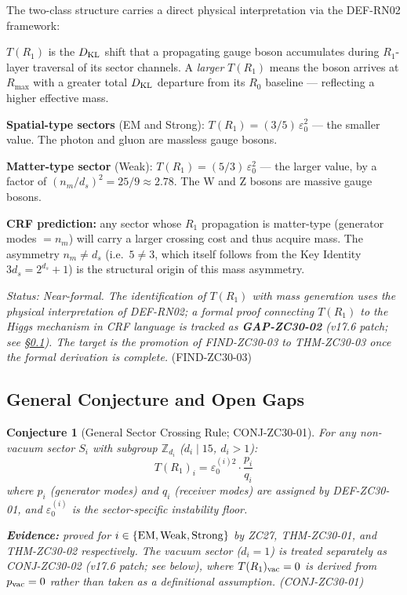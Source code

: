 \documentclass[12pt, a4paper]{article}
\newtheorem{conjecture}{Conjecture}[section]
\begin{document}
\begin{derivedbox}[title={FIND-ZC30-03:
  Massless/Massive Signature at $R_0$ Layer (Near-formal)}]
The two-class structure carries a direct physical interpretation
via the DEF-RN02 framework:

\medskip
$T(R_1)$ is the $D_{\rm KL}$ shift that a propagating gauge boson
accumulates during $R_1$-layer traversal of its sector channels.
A \emph{larger} $T(R_1)$ means the boson arrives at $R_{\max}$
with a greater total $D_{\rm KL}$ departure from its $R_0$ baseline
--- reflecting a higher effective mass.

\medskip
\textbf{Spatial-type sectors} (EM and Strong):
$T(R_1) = (3/5)\,\varepsilon_0^2$ --- the smaller value.
The photon and gluon are massless gauge bosons.

\medskip
\textbf{Matter-type sector} (Weak):
$T(R_1) = (5/3)\,\varepsilon_0^2$ --- the larger value, by a
factor of $(n_m/d_s)^2 = 25/9 \approx 2.78$.
The W and Z bosons are massive gauge bosons.

\medskip
\textbf{CRF prediction:} any sector whose $R_1$ propagation is
matter-type (generator modes $= n_m$) will carry a larger crossing
cost and thus acquire mass.
The asymmetry $n_m \neq d_s$ (i.e.\ $5 \neq 3$, which itself
follows from the Key Identity $3d_s = 2^{d_s}+1$) is the
structural origin of this mass asymmetry.

\medskip
\textit{Status: Near-formal. The identification of $T(R_1)$
with mass generation uses the physical interpretation of
DEF-RN02; a formal proof connecting $T(R_1)$ to the
Higgs mechanism in CRF language is tracked as
\textbf{GAP-ZC30-02} (v17.6 patch; see \S\ref{zc30:sec:gaps}).
The target is the promotion of FIND-ZC30-03 to THM-ZC30-03
once the formal derivation is complete.}
\hfill\textup{(FIND-ZC30-03)}
\end{derivedbox}

\subsection{General Conjecture and Open Gaps}
\label{zc30:sec:gaps}

\begin{conjecture}[General Sector Crossing Rule; CONJ-ZC30-01]
\label{zc30:conj:general}
For any non-vacuum sector $S_i$ with subgroup
$\mathbb{Z}_{d_i}$ ($d_i \mid 15$, $d_i > 1$):
\[
  T(R_1)_i = \varepsilon_0^{(i)2} \cdot \frac{p_i}{q_i}
  \tag{CONJ-ZC30-01}
\]
where $p_i$ (generator modes) and $q_i$ (receiver modes)
are assigned by DEF-ZC30-01, and $\varepsilon_0^{(i)}$ is
the sector-specific instability floor.

\textbf{Evidence:} proved for $i \in \{\rm EM, Weak, Strong\}$
by ZC27, THM-ZC30-01, and THM-ZC30-02 respectively.
The vacuum sector ($d_i = 1$) is treated separately as
CONJ-ZC30-02 (v17.6 patch; see below), where
$T(R_1)_{\rm vac} = 0$ is derived from $p_{\rm vac} = 0$
rather than taken as a definitional assumption.
\hfill\textup{(CONJ-ZC30-01)}
\end{conjecture}
\end{document}
